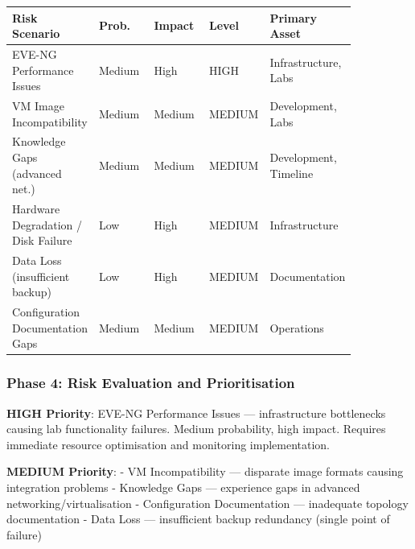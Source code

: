 {\footnotesize\begin{longtable}[]{@{}
  >{\raggedright\arraybackslash}p{0.17\linewidth}
  >{\raggedright\arraybackslash}p{0.17\linewidth}
  >{\raggedright\arraybackslash}p{0.17\linewidth}
  >{\raggedright\arraybackslash}p{0.17\linewidth}
  >{\raggedright\arraybackslash}p{0.17\linewidth}@{}}
\toprule\noalign{}
\begin{minipage}[b]{\linewidth}\raggedright
\textbf{Risk Scenario}
\end{minipage} & \begin{minipage}[b]{\linewidth}\raggedright
\textbf{Prob.}
\end{minipage} & \begin{minipage}[b]{\linewidth}\raggedright
\textbf{Impact}
\end{minipage} & \begin{minipage}[b]{\linewidth}\raggedright
\textbf{Level}
\end{minipage} & \begin{minipage}[b]{\linewidth}\raggedright
\textbf{Primary Asset}
\end{minipage} \\
\midrule\noalign{}
\endhead
\bottomrule\noalign{}
\endlastfoot
EVE-NG Performance Issues & Medium & High & HIGH & Infrastructure, Labs \\
VM Image Incompatibility & Medium & Medium & MEDIUM & Development, Labs \\
Knowledge Gaps (advanced net.) & Medium & Medium & MEDIUM & Development, Timeline \\
Hardware Degradation / Disk Failure & Low & High & MEDIUM & Infrastructure \\
Data Loss (insufficient backup) & Low & High & MEDIUM & Documentation \\
Configuration Documentation Gaps & Medium & Medium & MEDIUM & Operations \\
\end{longtable}}

\subsubsection{Phase 4: Risk Evaluation and Prioritisation}

\textbf{HIGH Priority}: EVE-NG Performance Issues --- infrastructure bottlenecks causing lab functionality failures. Medium probability, high impact. Requires immediate resource optimisation and monitoring implementation.

\textbf{MEDIUM Priority}: - VM Incompatibility --- disparate image formats causing integration problems - Knowledge Gaps --- experience gaps in advanced networking/virtualisation - Configuration Documentation --- inadequate topology documentation - Data Loss --- insufficient backup redundancy (single point of failure)


